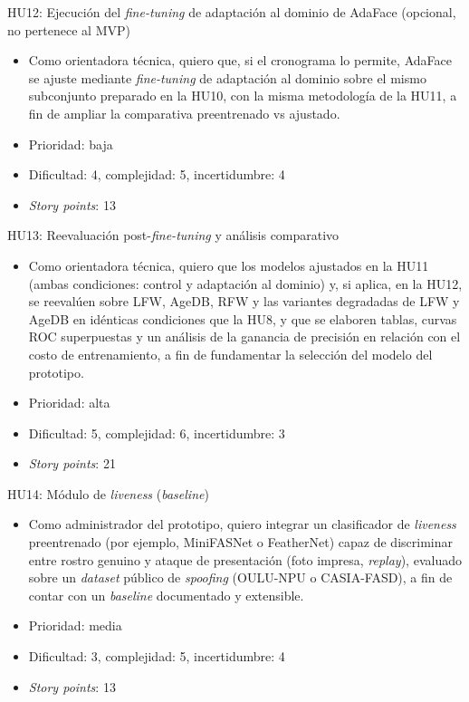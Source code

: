 \documentclass[
  11pt, %
]{charter}
\begin{document}
HU12: Ejecución del \textit{fine-tuning} de adaptación al dominio de AdaFace (opcional, no pertenece al MVP)
\begin{itemize}
  \item Como orientadora técnica, quiero que, si el cronograma lo permite, AdaFace se ajuste mediante \textit{fine-tuning} de adaptación al dominio sobre el mismo subconjunto preparado en la HU10, con la misma metodología de la HU11, a fin de ampliar la comparativa preentrenado vs ajustado.
  \item Prioridad: baja
  \item Dificultad: 4, complejidad: 5, incertidumbre: 4
  \item \textit{Story points}: 13
\end{itemize}

HU13: Reevaluación post-\textit{fine-tuning} y análisis comparativo
\begin{itemize}
  \item Como orientadora técnica, quiero que los modelos ajustados en la HU11 (ambas condiciones: control y adaptación al dominio) y, si aplica, en la HU12, se reevalúen sobre LFW, AgeDB, RFW y las variantes degradadas de LFW y AgeDB en idénticas condiciones que la HU8, y que se elaboren tablas, curvas ROC superpuestas y un análisis de la ganancia de precisión en relación con el costo de entrenamiento, a fin de fundamentar la selección del modelo del prototipo.
  \item Prioridad: alta
  \item Dificultad: 5, complejidad: 6, incertidumbre: 3
  \item \textit{Story points}: 21
\end{itemize}

HU14: Módulo de \textit{liveness} (\textit{baseline})
\begin{itemize}
  \item Como administrador del prototipo, quiero integrar un clasificador de \textit{liveness} preentrenado (por ejemplo, MiniFASNet o FeatherNet) capaz de discriminar entre rostro genuino y ataque de presentación (foto impresa, \textit{replay}), evaluado sobre un \textit{dataset} público de \textit{spoofing} (OULU-NPU o CASIA-FASD), a fin de contar con un \textit{baseline} documentado y extensible.
  \item Prioridad: media
  \item Dificultad: 3, complejidad: 5, incertidumbre: 4
  \item \textit{Story points}: 13
\end{itemize}
\end{document}
